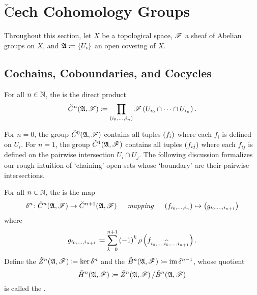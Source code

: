 \documentclass[../Moduli_Spaces_of_Riemann_Surfaces.tex]{subfiles}
\begin{document}
    \section{$\check{\textrm{C}}$ech Cohomology Groups}
    Throughout this section, let $X$ be a topological space, $\mathscr{F}$ a sheaf of Abelian groups on $X$, and $\mathfrak{A}\coloneqq\left\{U_i\right\}$ an open covering of $X$.
    \subsection{Cochains, Coboundaries, and Cocycles}
    \begin{definition}
        For all $n\in\mathbb{N}$, the  is the direct product
        \begin{equation*}
            \check{C}^n\!\left(\mathfrak{A},\mathscr{F}\right)\coloneqq\prod_{\left(i_0,\dots,i_n\right)}\mathscr{F}\left(U_{i_0}\cap\cdots\cap U_{i_n}\right).
        \end{equation*}
    \end{definition}
    \begin{remark}
        For $n=0$, the group $\check{C}^0\!\left(\mathfrak{A},\mathscr{F}\right)$ contains all tuples $\left(f_i\right)$ where each $f_i$ is defined on $U_i$. For $n=1$, the group $\check{C}^1\!\left(\mathfrak{A},\mathscr{F}\right)$ contains all tuples $\left(f_{ij}\right)$ where each $f_{ij}$ is defined on the pairwise intersection $U_i\cap U_j$. The following discussion formalizes our rough intuition of `chaining' open sets whose `boundary' are their pairwise intersections.\exqed
    \end{remark}
    \begin{definition}
        For all $n\in\mathbb{N}$, the  is the map
        \begin{equation*}
            \delta^n\!:\check{C}^n\!\l(\mf{A},\ms{F}\r)\to\check{C}^{n+1}\!\l(\mf{A},\ms{F}\r)\ \ \ \ \textrm{\it{mapping}}\ \ \ \ \l(f_{i_0,\dots,i_n}\r)\mapsto\l(g_{i_0,\dots,i_{n+1}}\r)
        \end{equation*}
        where
        \vspace{-0.05in}
        \begin{equation*}
            g_{i_0,\dots,i_{n+1}}\coloneqq\sum_{k=0}^{n+1}\left(-1\right)^k\rho\left(f_{i_0,\dots,\widehat{i_k},\dots,i_{n+1}}\right).
        \end{equation*}
        Define the  $\check{Z}^n\!\left(\mathfrak{A},\mathscr{F}\right)\coloneqq\ker\delta^n$ and the  $\check{B}^n\!\left(\mathfrak{A},\mathscr{F}\right)\coloneqq\operatorname{im}\delta^{n-1}$, whose quotient
        \begin{equation*}
            \check{H}^n\!\l(\mf{A},\ms{F}\r)\coloneqq\check{Z}^n\!\l(\mf{A},\ms{F}\r)/\check{B}^n\!\l(\mf{A},\ms{F}\r)
            \vspace{-0.05in}
        \end{equation*}
        is called the .
    \end{definition}
\end{document}

